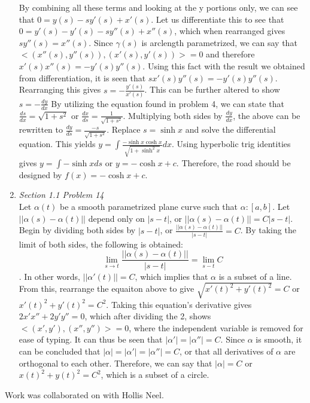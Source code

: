 \documentclass{article}
\begin{document}
\begin{enumerate}
By combining all these terms and looking at the y portions only, we can see that $0 = y(s) -sy'(s) + x'(s)$. 
Let us differentiate this to see that $0 = y'(s) -y'(s) -sy''(s) + x''(s)$, which when rearranged gives $sy''(s) = x''(s)$.
Since $\gamma(s)$ is arclength parametrized, we can say that $<(x''(s),y''(s)),(x'(s),y'(s))> = 0$ and therefore $x'(s)x''(s) = -y'(s)y''(s)$. 
Using this fact with the result we obtained from differentiation, it is seen that $sx'(s)y''(s) = -y'(s)y''(s)$. 
Rearranging this gives $s = -\frac{y'(s)}{x'(s)}$.
This can be further altered to show $s = -\frac{dy}{dx}$ 
By utilizing the equation found in problem 4, we can state that $\frac{ds}{dx} = \sqrt{1+s^2}$ or $\frac{dx}{ds} = \frac{1}{\sqrt{1+s^2}}$. 
Multiplying both sides by $\frac{dy}{dx}$, the above can be rewritten to $\frac{dy}{ds} = \frac{-s}{\sqrt{1+s^2}}$. 
Replace $s=\sinh{x}$ and solve the differential equation.
This yields $y = \displaystyle\int\frac{-\sinh{x}\cosh{x}}{\sqrt{1+\sinh^2{x}}}dx$.
Using hyperbolic trig identities gives $y = \displaystyle\int -\sinh{x}ds$ or $y = -\cosh{x} + c$.
Therefore, the road should be designed by $f(x) = -\cosh{x} + c$.

\newpage

\item \textit{Section 1.1 Problem 14}\\
Let $\alpha(t)$ be a smooth parametrized plane curve such that $\alpha:[a,b]$.
Let $||\alpha(s) - \alpha(t)||$ depend only on $|s-t|$, or $||\alpha(s)-\alpha(t)||=C|s-t|$. 
Begin by dividing both sides by $|s-t|$, or $\frac{||\alpha(s)-\alpha(t)||}{|s-t|} = C$.
By taking the limit of both sides, the following is obtained: $$\lim_{s\to t}\frac{||\alpha(s)-\alpha(t)||}{|s-t|} = \lim_{s-t} C$$.
In other words, $||\alpha'(t)|| = C$, which implies that $\alpha$ is a subset of a line.
From this, rearrange the equaiton above to give $\sqrt{x'(t)^2+y'(t)^2} = C$ or $x'(t)^2+y'(t)^2 = C^2$.
Taking this equation's derivative gives $2x'x''+2y'y'' = 0$, which after dividing the 2, shows $<(x',y'),(x'',y'')> = 0$, where the independent variable is removed for ease of typing.
It can thus be seen that $|\alpha'| = |\alpha''| = C$.
Since $\alpha$ is smooth, it can be concluded that $|\alpha| = |\alpha'| = |\alpha''| = C$, or that all derivatives of $\alpha$ are orthogonal to each other. 
Therefore, we can say that $|\alpha| = C$ or $x(t)^2+y(t)^2 = C^2$, which is a subset of a circle.

\end{enumerate}

Work was collaborated on with Hollis Neel.
\end{document}
